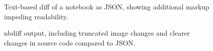 \documentclass{deliverablereport}
\begin{document}
\begin{figure}
    \center
    \caption{Text-based diff of a notebook as JSON, showing additional markup impeding readability.}
    \label{fig:json-diff}
\end{figure}

\begin{figure}
    \center
    \caption{nbdiff output, including truncated image changes and clearer changes in source code compared to JSON.}
    \label{fig:nbdiff}
\end{figure}
\end{document}
